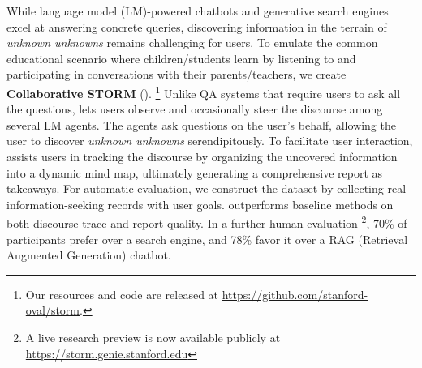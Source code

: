 While language model (LM)-powered chatbots and generative search engines excel at answering concrete queries, discovering information in the terrain of \textit{unknown unknowns} remains challenging for users. %
To emulate the common educational scenario where children/students learn by listening to and participating in conversations with their parents/teachers, we create \textbf{Collaborative STORM} (\textbf{\system}). \footnote{Our resources and code are released at \url{https://github.com/stanford-oval/storm}.}
Unlike QA systems that require users to ask all the questions, \system lets users observe and occasionally steer the discourse among several LM agents. The agents ask questions on the user's behalf, allowing the user to discover \textit{unknown unknowns} serendipitously. To facilitate user interaction, \system assists users in tracking the discourse by organizing the uncovered information into a dynamic mind map, ultimately generating a comprehensive report as takeaways. For automatic evaluation, we construct the \data dataset by collecting real information-seeking records with user goals. \system outperforms baseline methods on both discourse trace and report quality. In a further human evaluation \footnote{A live research preview is now available publicly at \url{https://storm.genie.stanford.edu}}, 70\% of participants prefer \system over a search engine, and 78\% favor it over a RAG (Retrieval Augmented Generation) chatbot.

